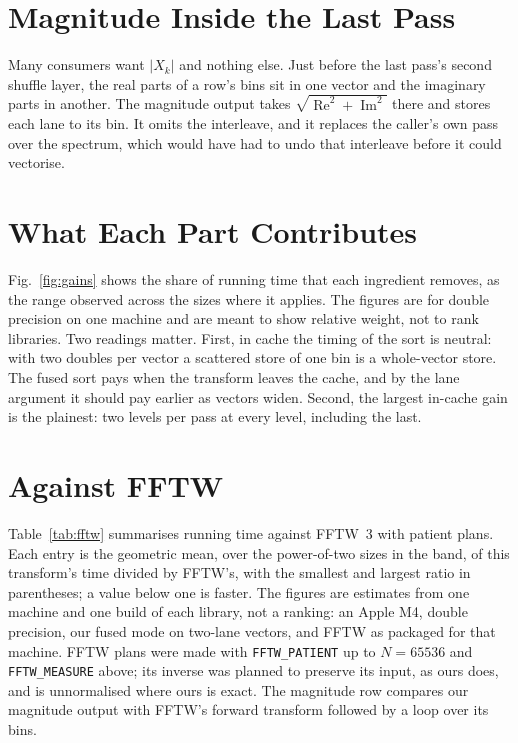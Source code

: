 \documentclass[conference]{IEEEtran}
\newcommand{\re}{\operatorname{Re}}
\newcommand{\im}{\operatorname{Im}}
\begin{document}
\section{Magnitude Inside the Last Pass}\label{sec:mag}

Many consumers want $|X_k|$ and nothing else.
Just before the last pass's second shuffle layer, the real parts of a row's bins sit in one vector and the imaginary parts in another.
The magnitude output takes $\sqrt{\re^2+\im^2}$ there and stores each lane to its bin.
It omits the interleave, and it replaces the caller's own pass over the spectrum, which would have had to undo that interleave before it could vectorise.

\section{What Each Part Contributes}

Fig.~\ref{fig:gains} shows the share of running time that each ingredient removes, as the range observed across the sizes where it applies.
The figures are for double precision on one machine and are meant to show relative weight, not to rank libraries.
Two readings matter.
First, in cache the timing of the sort is neutral: with two doubles per vector a scattered store of one bin is a whole-vector store.
The fused sort pays when the transform leaves the cache, and by the lane argument it should pay earlier as vectors widen.
Second, the largest in-cache gain is the plainest: two levels per pass at every level, including the last.


\section{Against FFTW}

Table~\ref{tab:fftw} summarises running time against FFTW~3 with patient plans.
Each entry is the geometric mean, over the power-of-two sizes in the band, of this transform's time divided by FFTW's, with the smallest and largest ratio in parentheses; a value below one is faster.
The figures are estimates from one machine and one build of each library, not a ranking: an Apple M4, double precision, our fused mode on two-lane vectors, and FFTW as packaged for that machine.
FFTW plans were made with \texttt{FFTW\_PATIENT} up to $N=65536$ and \texttt{FFTW\_MEASURE} above; its inverse was planned to preserve its input, as ours does, and is unnormalised where ours is exact.
The magnitude row compares our magnitude output with FFTW's forward transform followed by a loop over its bins.
\end{document}
